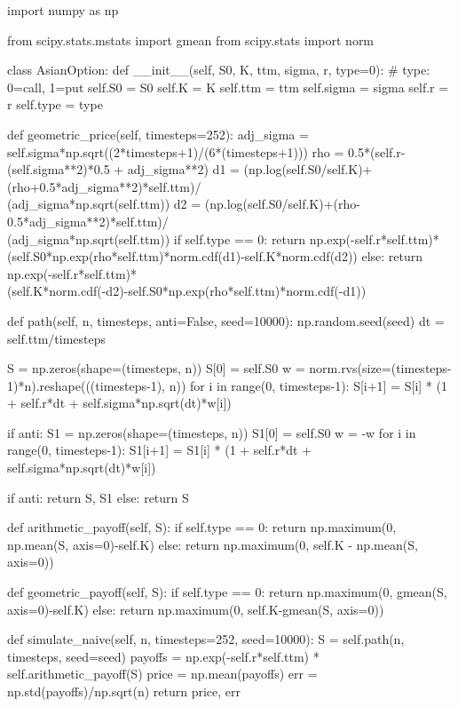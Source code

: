 \begin{ipython}
import numpy as np

from scipy.stats.mstats import gmean
from scipy.stats import norm

class AsianOption:
  def __init__(self, S0, K, ttm, sigma, r, type=0):
    # type: 0=call, 1=put
    self.S0 = S0
    self.K = K
    self.ttm = ttm
    self.sigma = sigma
    self.r = r
    self.type = type

  def geometric_price(self, timesteps=252):
    adj_sigma = self.sigma*np.sqrt((2*timesteps+1)/(6*(timesteps+1)))
    rho = 0.5*(self.r-(self.sigma**2)*0.5 + adj_sigma**2)
    d1 = (np.log(self.S0/self.K)+(rho+0.5*adj_sigma**2)*self.ttm)/\\
         (adj_sigma*np.sqrt(self.ttm))
    d2 = (np.log(self.S0/self.K)+(rho-0.5*adj_sigma**2)*self.ttm)/\\
         (adj_sigma*np.sqrt(self.ttm))
    if self.type == 0:
      return np.exp(-self.r*self.ttm)*\\
             (self.S0*np.exp(rho*self.ttm)*norm.cdf(d1)-self.K*norm.cdf(d2))
    else:
      return np.exp(-self.r*self.ttm)*\\
             (self.K*norm.cdf(-d2)-self.S0*np.exp(rho*self.ttm)*norm.cdf(-d1))

  def path(self, n, timesteps, anti=False, seed=10000):
    np.random.seed(seed)
    dt = self.ttm/timesteps
  
    S = np.zeros(shape=(timesteps, n))
    S[0] = self.S0
    w = norm.rvs(size=(timesteps-1)*n).reshape(((timesteps-1), n))
    for i in range(0, timesteps-1):
        S[i+1] = S[i] * (1 + self.r*dt  + self.sigma*np.sqrt(dt)*w[i])

    if anti:
      S1 = np.zeros(shape=(timesteps, n))
      S1[0] = self.S0
      w = -w
      for i in range(0, timesteps-1):
          S1[i+1] = S1[i] * (1 + self.r*dt  + self.sigma*np.sqrt(dt)*w[i])

    if anti:
      return S, S1
    else:
      return S

  def arithmetic_payoff(self, S):
    if self.type == 0:
      return np.maximum(0, np.mean(S, axis=0)-self.K)
    else:
      return np.maximum(0, self.K - np.mean(S, axis=0))

  def geometric_payoff(self, S):
    if self.type == 0:
      return np.maximum(0, gmean(S, axis=0)-self.K)
    else:
      return np.maximum(0, self.K-gmean(S, axis=0))

  def simulate_naive(self, n, timesteps=252, seed=10000):
    S = self.path(n, timesteps, seed=seed)
    payoffs = np.exp(-self.r*self.ttm) * self.arithmetic_payoff(S)
    price = np.mean(payoffs)
    err = np.std(payoffs)/np.sqrt(n)
    return price, err


\end{ipython}
